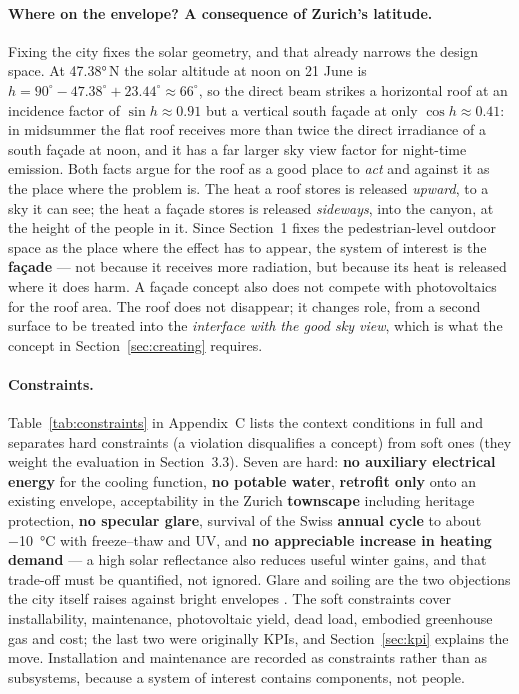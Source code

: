 \paragraph{Where on the envelope? A consequence of Zurich's latitude.} Fixing
the city fixes the solar geometry, and that already narrows the design space. At
\ang{47.38}\,N the solar altitude at noon on 21 June is
$h = 90^{\circ} - 47.38^{\circ} + 23.44^{\circ} \approx 66^{\circ}$, so the
direct beam strikes a horizontal roof at an incidence factor of
$\sin h \approx 0.91$ but a vertical south façade at only
$\cos h \approx 0.41$: in midsummer the flat roof receives more than twice the
direct irradiance of a south façade at noon, and it has a far larger sky view
factor for night-time emission. Both facts argue for the roof as a good place to
\emph{act} and against it as the place where the problem is. The heat a roof
stores is released \emph{upward}, to a sky it can see; the heat a façade stores
is released \emph{sideways}, into the canyon, at the height of the people in it.
Since Section~1 fixes the pedestrian-level outdoor space as the place where the
effect has to appear, the system of interest is the \textbf{façade} --- not
because it receives more radiation, but because its heat is released where it
does harm. A façade concept also does not compete with photovoltaics for the
roof area. The roof does not disappear; it changes role, from a second surface
to be treated into the \emph{interface with the good sky view}, which is what
the concept in Section~\ref{sec:creating} requires.

\paragraph{Constraints.} Table~\ref{tab:constraints} in Appendix~C lists the
context conditions in full and separates hard constraints (a violation
disqualifies a concept) from soft ones (they weight the evaluation in
Section~3.3). Seven are hard: \textbf{no auxiliary electrical energy} for the
cooling function, \textbf{no potable water}, \textbf{retrofit only} onto an
existing envelope, acceptability in the Zurich \textbf{townscape} including
heritage protection, \textbf{no specular glare}, survival of the Swiss
\textbf{annual cycle} to about \qty{-10}{\celsius} with freeze--thaw and UV, and
\textbf{no appreciable increase in heating demand} --- a high solar reflectance
also reduces useful winter gains, and that trade-off must be quantified, not
ignored. Glare and soiling are the two objections the city itself raises against
bright envelopes \parencite[128]{stadtzuerich2020}. The soft constraints cover
installability, maintenance, photovoltaic yield, dead load, embodied greenhouse
gas and cost; the last two were originally KPIs, and Section~\ref{sec:kpi}
explains the move. Installation and maintenance are recorded as constraints
rather than as subsystems, because a system of interest contains components, not
people.


